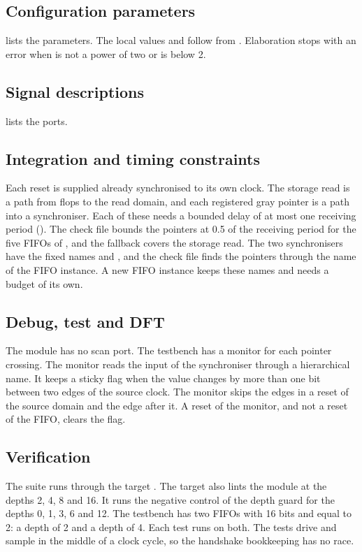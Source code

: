 \subsection{Configuration parameters}
 lists the parameters. The local values  and  follow from . Elaboration stops with an error when  is not a power of two or is below 2.



\subsection{Signal descriptions}
 lists the ports.



\subsection{Integration and timing constraints}
Each reset is supplied already synchronised to its own clock. The storage read is a path from  flops to the read domain, and each registered gray pointer is a path into a synchroniser. Each of these needs a bounded delay of at most one receiving period (). The check file bounds the pointers at 0.5 of the receiving period for the five FIFOs of , and the fallback covers the storage read. The two synchronisers have the fixed names  and , and the check file finds the pointers through the name of the FIFO instance. A new FIFO instance keeps these names and needs a budget of its own.

\subsection{Debug, test and DFT}
The module has no scan port. The testbench  has a monitor for each pointer crossing. The monitor reads the input of the synchroniser through a hierarchical name. It keeps a sticky flag when the value changes by more than one bit between two edges of the source clock. The monitor skips the edges in a reset of the source domain and the edge after it. A reset of the monitor, and not a reset of the FIFO, clears the flag.

\subsection{Verification}
The suite  runs through the target . The target also lints the module at the depths 2, 4, 8 and 16. It runs the negative control of the depth guard for the depths 0, 1, 3, 6 and 12. The testbench has two FIFOs with 16 bits and  equal to 2: a depth of 2 and a depth of 4. Each test runs on both. The tests drive and sample in the middle of a clock cycle, so the handshake bookkeeping has no race.

